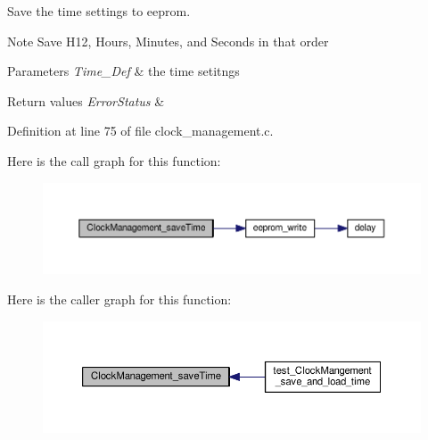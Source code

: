 Save the time settings to eeprom. 

\begin{DoxyNote}{Note}
Save H12, Hours, Minutes, and Seconds in that order 
\end{DoxyNote}

\begin{DoxyParams}{Parameters}
{\em Time\+\_\+\+Def} & the time setitngs \\
\hline
\end{DoxyParams}

\begin{DoxyRetVals}{Return values}
{\em Error\+Status} & \\
\hline
\end{DoxyRetVals}


Definition at line 75 of file clock\+\_\+management.\+c.



Here is the call graph for this function\+:\nopagebreak
\begin{figure}[H]
\begin{center}
\leavevmode
\includegraphics[width=350pt]{df/d13/group___clock___management___eeprom_ga4d1c66f7ce4d69b6903471823ab105f7_cgraph}
\end{center}
\end{figure}




Here is the caller graph for this function\+:\nopagebreak
\begin{figure}[H]
\begin{center}
\leavevmode
\includegraphics[width=350pt]{df/d13/group___clock___management___eeprom_ga4d1c66f7ce4d69b6903471823ab105f7_icgraph}
\end{center}
\end{figure}


